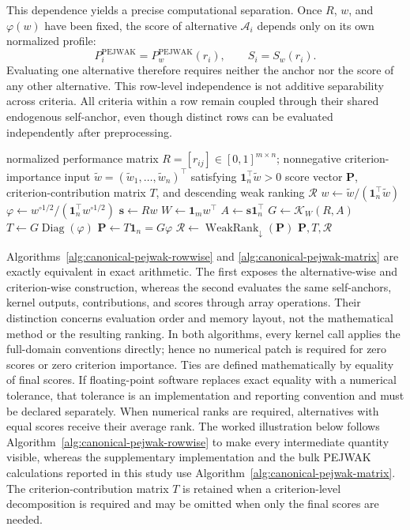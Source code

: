 \documentclass[reqno,11pt]{amsart}
\theoremstyle{definition}
\theoremstyle{plain}
\theoremstyle{remark}
\begin{document}
This dependence yields a precise computational separation. Once \(R\), \(w\),
and \(\varphi(w)\) have been fixed, the score of alternative
\(\mathcal A_i\) depends only on its own normalized profile:
\[
P_i^{\mathrm{PEJWAK}}=P_w^{\mathrm{PEJWAK}}(r_i),
\qquad
S_i=S_w(r_i).
\]
Evaluating one alternative therefore requires neither the anchor nor the score
of any other alternative. This row-level independence is not additive
separability across criteria. All criteria within a row remain coupled through
their shared endogenous self-anchor, even though distinct rows can be evaluated
independently after preprocessing.

\begin{algorithm}[htbp]
\caption{Equivalent matrix--vector evaluation of canonical PEJWAK}
\label{alg:canonical-pejwak-matrix}
\begin{algorithmic}[1]
\Require normalized performance matrix
\(R=[r_{ij}]\in[0,1]^{m\times n}\); nonnegative criterion-importance input
\(\widetilde w=(\widetilde w_1,\ldots,\widetilde w_n)^\top\) satisfying
\(\mathbf 1_n^\top\widetilde w>0\)
\Ensure score vector \(\mathbf P\), criterion-contribution matrix \(T\), and
descending weak ranking \(\mathcal R\)
\State \(w\gets\widetilde w/(\mathbf 1_n^\top\widetilde w)\)
\State \(\varphi\gets w^{\circ 1/2}/(\mathbf 1_n^\top w^{\circ 1/2})\)
\State \(\mathbf s\gets Rw\)
\State \(W\gets\mathbf 1_mw^\top\)
\State \(A\gets\mathbf s\mathbf 1_n^\top\)
\State \(G\gets\mathcal K_W(R,A)\)
\State \(T\gets G\operatorname{Diag}(\varphi)\)
\State \(\mathbf P\gets T\mathbf 1_n=G\varphi\)
\State \(\mathcal R\gets\operatorname{WeakRank}_{\downarrow}(\mathbf P)\)
\State \Return \(\mathbf P,T,\mathcal R\)
\end{algorithmic}
\end{algorithm}

Algorithms~\ref{alg:canonical-pejwak-rowwise} and
\ref{alg:canonical-pejwak-matrix} are exactly equivalent in exact arithmetic.
The first exposes the alternative-wise and criterion-wise construction, whereas
the second evaluates the same self-anchors, kernel outputs, contributions, and
scores through array operations. Their distinction concerns evaluation order
and memory layout, not the mathematical method or the resulting ranking. In
both algorithms, every kernel call applies the full-domain conventions
directly; hence no numerical patch is required for zero scores or zero
criterion importance. Ties are defined mathematically by equality of final
scores. If floating-point software replaces exact equality with a numerical
tolerance, that tolerance is an implementation and reporting convention and
must be declared separately. When numerical ranks are required, alternatives
with equal scores receive their average rank. The worked illustration below
follows Algorithm~\ref{alg:canonical-pejwak-rowwise} to make every intermediate
quantity visible, whereas the supplementary implementation and the bulk
PEJWAK calculations reported in this study use
Algorithm~\ref{alg:canonical-pejwak-matrix}. The criterion-contribution matrix
\(T\) is retained when a criterion-level decomposition is required and may be
omitted when only the final scores are needed.
\end{document}
